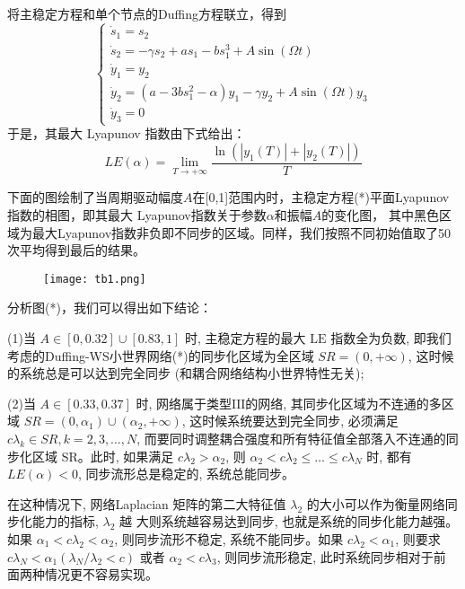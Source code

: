 将主稳定方程和单个节点的Duffing方程联立，得到
\begin{equation}
    \left\{\begin{array}{l}
    \dot{s}_1=s_2 \\
    \dot{s}_2=-\gamma s_2+a s_1-b s_1^3+A \sin (\Omega t) \\
    \dot{y}_1=y_2 \\
    \dot{y}_2=\left(a-3 b s_1^2-\alpha\right) y_1-\gamma y_2+A \sin (\Omega t) y_3 \\
    \dot{y}_3=0
    \end{array}\right.
\end{equation}
于是，其最大 Lyapunov 指数由下式给出：
\begin{equation}
L E(\alpha)=\lim _{T \rightarrow+\infty}
\frac{\ln \left(\left|y_1(T)\right|+\left|y_2(T)\right|\right)}{T}
\end{equation}

下面的图绘制了当周期驱动幅度$A$在[0,1]范围内时，主稳定方程(*)平面Lyapunov指数的相图，即其最大 Lyapunov指数关于参数$\alpha$和振幅$A$的变化图，
其中黑色区域为最大Lyapunov指数非负即不同步的区域。同样，我们按照不同初始值取了50次平均得到最后的结果。\par
\begin{figure}[!htbp]
    \centering
    \texttt{[image: tb1.png]}
\end{figure}
分析图(*)，我们可以得出如下结论：

(1)当 $A \in[0,0.32] \cup[0.83,1]$ 时, 主稳定方程的最大 $\mathrm{LE}$ 指数全为负数, 即我们考虑的Duffing-WS小世界网络(*)的同步化区域为全区域 $S R=(0,+\infty)$,
这时候的系统总是可以达到完全同步 (和耦合网络结构小世界特性无关);\par

(2)当 $A \in[0.33,0.37]$ 时, 网络属于类型$\mathrm{III}$的网络, 其同步化区域为不连通的多区域 $S R=\left(0, \alpha_1\right) \cup\left(\alpha_2,+\infty\right)$,
这时候系统要达到完全同步, 必须满足 $c \lambda_k \in S R, k=2,3, \ldots, N$,
而要同时调整耦合强度和所有特征值全部落入不连通的同步化区域 SR。此时,
如果满足 $c \lambda_2>\alpha_2$, 则 $\alpha_2<c \lambda_2 \leq \ldots \leq c \lambda_N$ 时,
都有 $L E(\alpha)<0$, 同步流形总是稳定的, 系统总能同步。

在这种情况下, 网络Laplacian 矩阵的第二大特征值
$\lambda_2$ 的大小可以作为衡量网络同步化能力的指标, $\lambda_2$ 越 大则系统越容易达到同步, 也就是系统的同步化能力越强。
如果 $\alpha_1<c \lambda_2<\alpha_2$, 则同步流形不稳定, 系统不能同步。如果 $c \lambda_2<\alpha_1$,
则要求 $c \lambda_N<\alpha_1\left(\lambda_N / \lambda_2<c\right)$ 或者 $\alpha_2<c \lambda_3$, 则同步流形稳定,
此时系统同步相对于前 面两种情况更不容易实现。

